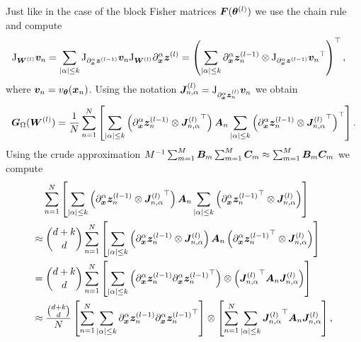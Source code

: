 Just like in the case of the block Fisher matrices ${\bm{F}}({\bm{\theta}}^{(l)})$ we use the chain rule and compute
\begin{align*}
    \mathrm{J}_{{\bm{W}}^{(l)}} {\bm{v}}_n & = \sum_{\lvert \alpha \rvert\le k}\mathrm{J}_{\partial_{\bm{x}}^\alpha {\bm{z}}^{(l-1)}}{\bm{v}}_n \mathrm{J}_{{\bm{W}}^{(l)}} \partial_{\bm{x}}^\alpha {\bm{z}}^{(l)} = 
    \left(\sum_{\lvert \alpha \rvert\le k} \partial_{\bm{x}}^\alpha {\bm{z}}^{(l-1)}_n \otimes {\mathrm{J}_{\partial_{\bm{x}}^\alpha {\bm{z}}^{(l-1)}} {\bm{v}}_n}^\top\right)^\top,
\end{align*}
where ${\bm{v}}_n = v_{\bm{\theta}}({\bm{x}}_n)$. 
Using the notation ${\bm{J}}^{(l)}_{n,\alpha} = \mathrm{J}_{\partial_{\bm{x}}^\alpha {\bm{z}}_n^{(l)}} {\bm{v}}_n$ we obtain
\begin{equation}\label{eq:laplace_gramian_block_exact}
    {\bm{G}}_\Omega({\bm{W}}^{(l)})
    =
    \frac1N\sum_{n=1}^N
    \left[\sum_{\lvert \alpha \rvert\le k} \left( \partial_{\bm{x}}^\alpha {\bm{z}}^{(l-1)}_n \otimes {{\bm{J}}_{n,\alpha}^{(l)}}^\top \right)
    {\bm{A}}_n 
    \sum_{\lvert \alpha \rvert\le k} \left( \partial_{\bm{x}}^\alpha {\bm{z}}^{(l-1)}_n \otimes {{\bm{J}}_{n,\alpha}^{(l)}}^\top \right)^\top\right]. 
\end{equation}
Using the crude approximation $M^{-1}\sum_{m=1}^M {\bm{B}}_m\sum_{m=1}^M {\bm{C}}_m \approx \sum_{m=1}^M {\bm{B}}_m {\bm{C}}_m$ we compute 
\begin{align}
    \begin{split}
        & \sum_{n=1}^N
    \left[\sum_{\lvert \alpha \rvert\le k} \left( \partial_{\bm{x}}^\alpha {\bm{z}}^{(l-1)}_n\otimes {{\bm{J}}_{n,\alpha}^{(l)}}^\top \right)
    {\bm{A}}_n
    \sum_{\lvert \alpha \rvert\le k} \left( \partial_{\bm{x}}^\alpha {{\bm{z}}^{(l-1)}_n}^\top\otimes {\bm{J}}_{n,\alpha}^{(l)} \right)\right]
    \\ \approx & \;
    \binom{d+k}{d} \sum_{n=1}^N
    \left[\sum_{\lvert \alpha \rvert\le k} \left( \partial_{\bm{x}}^\alpha {\bm{z}}^{(l-1)}_n \otimes {\bm{J}}_{n,\alpha}^{(l)} \right)
    {\bm{A}}_n
    \left( \partial_{\bm{x}}^\alpha {{\bm{z}}^{(l-1)}_n}^\top \otimes {\bm{J}}_{n,\alpha}^{(l)} \right)\right]
    \\ = & \;
    \binom{d+k}{d}\sum_{n=1}^N
    \left[\sum_{\lvert \alpha \rvert\le k} \left( \partial_{\bm{x}}^\alpha {\bm{z}}^{(l-1)}_n{\partial_{\bm{x}}^\alpha {\bm{z}}^{(l-1)}_n}^\top\right) \otimes \left({{\bm{J}}_{n,\alpha}^{(l)}}^\top {\bm{A}}_n{{\bm{J}}_{n,\alpha}^{(l)}}\right)
    \right]
    \\ \approx & \;
    \frac{\binom{d+k}{d}}{N}\left[\sum_{n=1}^N \sum_{\lvert \alpha \rvert\le k} \partial_{\bm{x}}^\alpha {\bm{z}}^{(l-1)}_n{\partial_{\bm{x}}^\alpha {\bm{z}}^{(l-1)}_n}^\top \right]
    \otimes
    \left[\sum_{n=1}^N\sum_{\lvert \alpha \rvert\le k} {{\bm{J}}^{(l)}_{n,\alpha}}^\top{\bm{A}}_n{{\bm{J}}^{(l)}_{n,\alpha}} \right],
    \end{split}
\end{align}
